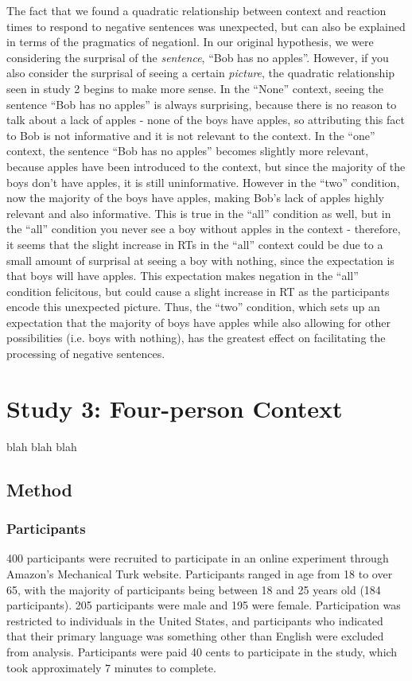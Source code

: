 \documentclass[10pt,letterpaper]{article}
\begin{document}
The fact that we found a quadratic relationship between context and reaction times to respond to negative sentences was unexpected, but can also be explained in terms of the pragmatics of negationl.  In our original hypothesis, we were considering the surprisal of the \emph{sentence}, ``Bob has no apples''.  However, if you also consider the surprisal of seeing a certain \emph{picture}, the quadratic relationship seen in study 2 begins to make more sense.  In the ``None'' context, seeing the sentence ``Bob has no apples'' is always surprising, because there is no reason to talk about a lack of apples - none of the boys have apples, so attributing this fact to Bob is not informative and it is not relevant to the context.  In the ``one'' context, the sentence ``Bob has no apples'' becomes slightly more relevant, because apples have been introduced to the context, but since the majority of the boys don't have apples, it is still uninformative.  However in the ``two'' condition, now the majority of the boys have apples, making Bob's lack of apples highly relevant and also informative.  This is true in the ``all'' condition as well, but in the ``all'' condition you never see a boy without apples in the context - therefore, it seems that the slight increase in RTs in the ``all'' context could be due to a small amount of surprisal at seeing a boy with nothing, since the expectation is that boys will have apples.  This expectation makes negation in the ``all'' condition felicitous, but could cause a slight increase in RT as the participants encode this unexpected picture.  Thus, the ``two'' condition, which sets up an expectation that the majority of boys have apples while also allowing for other possibilities (i.e. boys with nothing), has the greatest effect on facilitating the processing of negative sentences. 



\section{Study 3: Four-person Context}
blah blah blah

\subsection{Method}

\subsubsection{Participants}
400 participants were recruited to participate in an online experiment through Amazon's Mechanical Turk website.  Participants ranged in age from 18 to over 65, with the majority of participants being between 18 and 25 years old (184 participants).  205 participants were male and 195 were female.  Participation was restricted to individuals in the United States, and participants who indicated that their primary language was something other than English were excluded from analysis.  Participants were paid 40 cents to participate in the study, which took approximately 7 minutes to complete.
\end{document}
